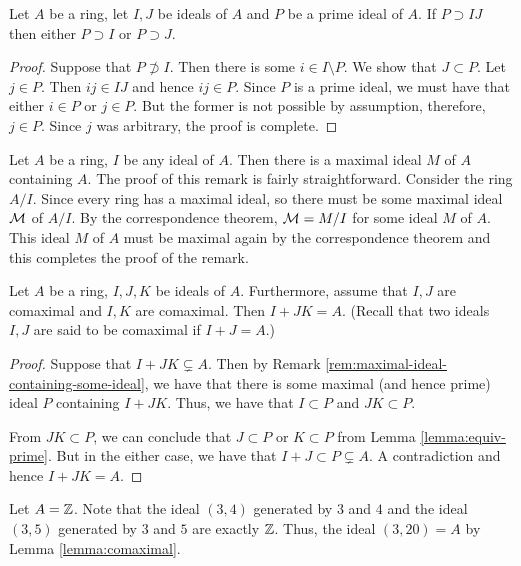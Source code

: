
\begin{lemma}
    Let $A$ be a ring, let $I,J $ be ideals of $A$ and $P$ be a prime ideal of $A$. If $P \supset IJ$ then either $P \supset I$ or $P\supset J$.
    \label{lemma:equiv-prime}
\end{lemma}
\begin{proof}
    Suppose that $P \not \supset I$. Then there is some $i\in I \setminus P$. We show that $J \subset P$. Let $j \in P$. Then $ij \in IJ$ and hence $ij \in P$. Since $P$ is a prime ideal, we must have that either $i\in P $ or $j \in P$. But the former is not possible by assumption, therefore, $j\in P$. Since $j$ was arbitrary, the proof is complete.
\end{proof}

\begin{remark}
    Let $A$ be a ring, $I$ be any ideal of $A$. Then there is a maximal ideal $M$ of $A$ containing $A$. The proof of this remark is fairly straightforward. Consider the ring $A/I$. Since every ring has a maximal ideal, so there must be some maximal ideal ${\cal M}$ of $A/I$. By the correspondence theorem, ${\cal M} = M/I$ for some ideal $M$ of $A$. This ideal $M$ of $A$ must be maximal again by the correspondence theorem and this completes the proof of the remark.
    \label{rem:maximal-ideal-containing-some-ideal}
\end{remark}

\begin{lemma}
    Let $A$ be a ring, $I, J, K$ be ideals of $A$. Furthermore, assume that $I, J$ are comaximal and $I, K$ are comaximal. Then $I+JK=A$. (Recall that two ideals $I,J$ are said to be comaximal if $I+J=A$.)
    \label{lemma:comaximal}
\end{lemma}
\begin{proof}
    Suppose that $I+JK \subsetneq A$. Then by Remark \ref{rem:maximal-ideal-containing-some-ideal}, we have that there is some maximal (and hence prime) ideal $P$ containing $I+JK$. Thus, we have that $I\subset P$ and $JK \subset P$. 

    From $JK \subset P$, we can conclude that $J\subset P$ or $K \subset P$ from Lemma \ref{lemma:equiv-prime}. But in the either case, we have that $I+J \subset P \subsetneq A$. A contradiction and hence $I+JK = A$.
\end{proof}

\begin{example}
    Let $A=\mathbb Z$. Note that the ideal $\left( 3,4 \right)$ generated by $3$ and $4$ and the ideal $\left( 3,5 \right)$ generated by $3$ and $5$ are exactly $\mathbb Z$. Thus, the ideal $\left( 3, 20 \right) =A$ by Lemma \ref{lemma:comaximal}.
\end{example}

